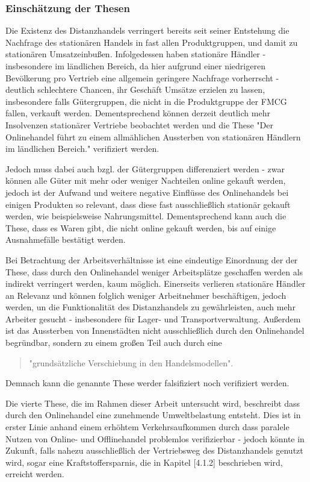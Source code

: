  
\subsubsection{Einschätzung der Thesen}

Die Existenz des Distanzhandels verringert bereits seit seiner Entstehung die Nachfrage des stationären Handels in fast allen Produktgruppen, und damit zu stationären Umsatzeinbußen. Infolgedessen haben stationäre Händler - insbesondere im ländlichen Bereich, da hier aufgrund einer niedrigeren Bevölkerung pro Vertrieb eine allgemein geringere Nachfrage vorherrscht - deutlich schlechtere Chancen, ihr Geschäft Umsätze erzielen zu lassen, insbesondere falls Gütergruppen, die nicht in die Produktgruppe der \ac{FMCG} fallen, verkauft werden. Dementsprechend können derzeit deutlich mehr Insolvenzen stationärer Vertriebe beobachtet werden und die These "Der Onlinehandel führt zu einem allmählichen Aussterben von stationären Händlern im ländlichen Bereich." verifiziert werden.

Jedoch muss dabei auch bzgl. der Gütergruppen differenziert werden - zwar können alle Güter mit mehr oder weniger Nachteilen online gekauft werden, jedoch ist der Aufwand und weitere negative Einflüsse des Onlinehandels bei einigen Produkten so relevant, dass diese fast ausschließlich stationär gekauft werden, wie beispielsweise Nahrungsmittel. Dementsprechend kann auch die These, dass es Waren gibt, die nicht online gekauft werden, bis auf einige Ausnahmefälle bestätigt werden.

Bei Betrachtung der Arbeitsverhältnisse ist eine eindeutige Einordnung der der These, dass durch den Onlinehandel weniger Arbeitsplätze geschaffen werden als indirekt verringert werden, kaum möglich. Einerseits verlieren stationäre Händler an Relevanz und können folglich weniger Arbeitnehmer beschäftigen, jedoch werden, un die Funktionalität des Distanzhandels zu gewährleisten, auch mehr Arbeiter gesucht - insbesondere für Lager- und Transportverwaltung. Außerdem ist das Aussterben von Innenstädten nicht ausschließlich durch den Onlinehandel begründbar, sondern zu einem großen Teil auch durch eine 
\begin{quote}
"grundsätzliche Verschiebung in den Handelsmodellen"\cite{evilcom}.
\end{quote}
Demnach kann die genannte These werder falsifiziert noch verifiziert werden.

Die vierte These, die im Rahmen dieser Arbeit untersucht wird, beschreibt dass durch den Onlinehandel eine zunehmende Umweltbelastung entsteht. Dies ist in erster Linie anhand einem erhöhtem Verkehrsaufkommen durch dass paralele Nutzen von Online- und Offlinehandel problemlos verifizierbar - jedoch könnte in Zukunft, falls nahezu ausschließlich der Vertriebsweg des Distanzhandels genutzt wird, sogar eine Kraftstoffersparnis, die in Kapitel [4.1.2] beschrieben wird, erreicht werden.
